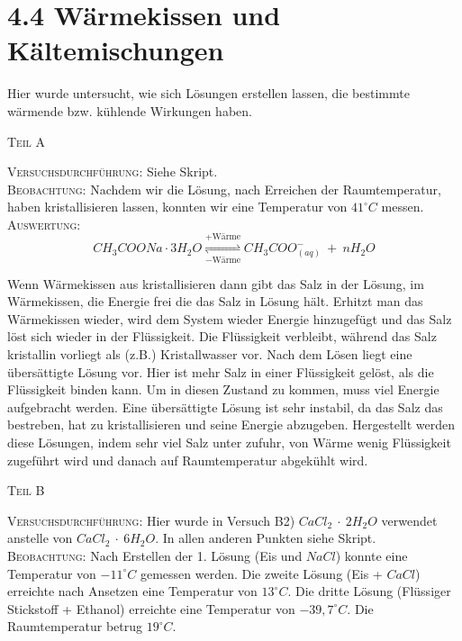 \documentclass[A4paper, 11p]{article}
\begin{document}
\newpage
\section{4.4 Wärmekissen und Kältemischungen}

Hier wurde untersucht, wie sich Lösungen erstellen lassen, die bestimmte wärmende bzw. kühlende Wirkungen haben.

\begin{center}
\textsc{Teil A}
\end{center}

\textsc{Versuchsdurchführung:} Siehe Skript.\\

\textsc{Beobachtung:}\hspace{5mm} Nachdem wir die Lösung, nach Erreichen der Raumtemperatur, haben kristallisieren lassen, konnten wir eine Temperatur von $41^\circ C$ messen.\\

\textsc{Auswertung:}\hspace{8mm} $$CH_3COONa\cdot 3H_2O \underset{-\text{Wärme}}{\stackrel{+\text{Wärme}}{\rightleftharpoons}} CH_3COO^-_{(aq)}\ +\ nH_2O$$

Wenn Wärmekissen aus kristallisieren dann gibt das Salz in der Lösung, im Wärmekissen, die Energie frei die das Salz in Lösung hält. Erhitzt man das Wärmekissen wieder, wird dem System wieder Energie hinzugefügt und das Salz löst sich wieder in der Flüssigkeit. Die Flüssigkeit verbleibt, während das Salz kristallin vorliegt als (z.B.) Kristallwasser vor. Nach dem Lösen liegt eine übersättigte Lösung vor. Hier ist mehr Salz in einer Flüssigkeit gelöst, als die Flüssigkeit binden kann. Um in diesen Zustand zu kommen, muss viel Energie aufgebracht werden. Eine übersättigte Lösung ist sehr instabil, da das Salz das bestreben, hat zu kristallisieren und seine Energie abzugeben. Hergestellt werden diese Lösungen, indem sehr viel Salz unter zufuhr, von Wärme wenig Flüssigkeit zugeführt wird und danach auf Raumtemperatur abgekühlt wird.\\

\begin{center}
\textsc{Teil B}
\end{center}

\textsc{Versuchsdurchführung:} Hier wurde in Versuch B2) $CaCl_2\ \cdot\ 2H_2O$ verwendet anstelle von $CaCl_2\ \cdot\ 6H_2O$. In allen anderen Punkten siehe Skript.\\

\textsc{Beobachtung:}\hspace{5mm} Nach Erstellen der 1. Lösung (Eis und $NaCl$) konnte eine Temperatur von $-11^\circ C$ gemessen werden. Die zweite Lösung (Eis + $CaCl$) erreichte nach Ansetzen eine Temperatur von $13^\circ C$. Die dritte Lösung (Flüssiger Stickstoff + Ethanol) erreichte eine Temperatur von $-39,7^\circ C$. Die Raumtemperatur betrug $19^\circ C$.\\
\end{document}
